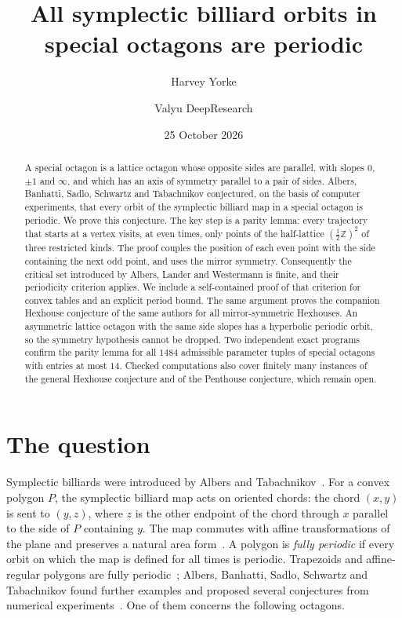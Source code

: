 \documentclass[11pt]{amsart}
\title{All symplectic billiard orbits in special octagons are periodic}
\author{Harvey Yorke}
\author{Valyu DeepResearch}
\date{25 October 2026}
\theoremstyle{definition}
\theoremstyle{remark}
\newcommand{\Z}{\mathbb Z}
\newcommand{\hZ}{\tfrac12\Z}
\begin{document}
\raggedbottom
\begin{abstract}
A special octagon is a lattice octagon whose opposite sides are parallel, with slopes $0$, $\pm1$ and $\infty$, and which has an axis of symmetry parallel to a pair of sides. Albers, Banhatti, Sadlo, Schwartz and Tabachnikov conjectured, on the basis of computer experiments, that every orbit of the symplectic billiard map in a special octagon is periodic. We prove this conjecture. The key step is a parity lemma: every trajectory that starts at a vertex visits, at even times, only points of the half-lattice $(\hZ)^2$ of three restricted kinds. The proof couples the position of each even point with the side containing the next odd point, and uses the mirror symmetry. Consequently the critical set introduced by Albers, Lander and Westermann is finite, and their periodicity criterion applies. We include a self-contained proof of that criterion for convex tables and an explicit period bound. The same argument proves the companion Hexhouse conjecture of the same authors for all mirror-symmetric Hexhouses. An asymmetric lattice octagon with the same side slopes has a hyperbolic periodic orbit, so the symmetry hypothesis cannot be dropped. Two independent exact programs confirm the parity lemma for all $1484$ admissible parameter tuples of special octagons with entries at most $14$. Checked computations also cover finitely many instances of the general Hexhouse conjecture and of the Penthouse conjecture, which remain open.
\end{abstract}
\maketitle

\section{The question}

Symplectic billiards were introduced by Albers and Tabachnikov~\cite{AT18}. For a convex polygon $P$, the symplectic billiard map acts on oriented chords: the chord $(x,y)$ is sent to $(y,z)$, where $z$ is the other endpoint of the chord through $x$ parallel to the side of $P$ containing $y$. The map commutes with affine transformations of the plane and preserves a natural area form~\cite{AT18,ABS25}. A polygon is \emph{fully periodic} if every orbit on which the map is defined for all times is periodic. Trapezoids and affine-regular polygons are fully periodic~\cite{AT18}; Albers, Banhatti, Sadlo, Schwartz and Tabachnikov found further examples and proposed several conjectures from numerical experiments~\cite{ABS25}. One of them concerns the following octagons.
\end{document}
